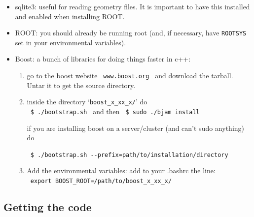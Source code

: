 \documentclass[a4paper,10pt]{article}
\begin{document}
\begin{itemize}

 \item sqlite3: useful for reading geometry files. It is important to have this installed and enabled when installing ROOT. 

 \item ROOT: you should already be running root (and, if necessary, have \verb|ROOTSYS| set in your environmental variables). 

 \item Boost: a bunch of libraries for doing things faster in c++: 
 
 \begin{enumerate} 
  
  \item go to the boost website \verb| www.boost.org | and download the tarball. Untar it to get the source directory. 
  
  \item inside the directory `\verb|boost_x_xx_x/|' do\\ \verb| $ ./bootstrap.sh | and then \verb| $ sudo ./bjam install| 
  
  if you are installing boost on a server/cluster (and can't sudo anything) do
  
  \verb| $ ./bootstrap.sh --prefix=path/to/installation/directory |
  
  \item Add the environmental variables: add to your .bashrc the line:\\ \verb| export BOOST_ROOT=/path/to/boost_x_xx_x/ |
   
 \end{enumerate}

 \vspace{-0.3cm}
 

\end{itemize}

\subsection{Getting the code}
\end{document}
